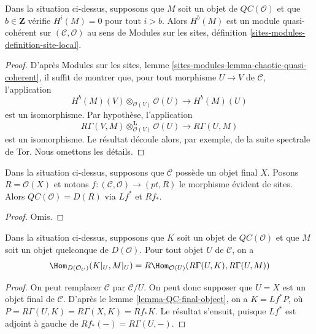 \begin{lemma}
\label{lemma-QC-bounded-above}
Dans la situation ci-dessus, supposons que $M$ soit un objet de
$\mathit{QC}(\mathcal{O})$ et que $b \in \mathbf{Z}$ vérifie $H^i(M) = 0$ pour
tout $i > b$. Alors $H^b(M)$ est un module quasi-cohérent sur
$(\mathcal{C}, \mathcal{O})$ au sens de Modules sur les sites, définition
\ref{sites-modules-definition-site-local}.
\end{lemma}

\begin{proof}
D'après Modules sur les sites, lemme
\ref{sites-modules-lemma-chaotic-quasi-coherent}, il suffit de montrer que,
pour tout morphisme $U \to V$ de $\mathcal{C}$, l'application
$$
H^b(M)(V) \otimes_{\mathcal{O}(V)} \mathcal{O}(U) \to H^b(M)(U)
$$
est un isomorphisme. Par hypothèse, l'application
$$
R\Gamma(V, M) \otimes_{\mathcal{O}(V)}^\mathbf{L} \mathcal{O}(U)
\to R\Gamma(U, M)
$$
est un isomorphisme. Le résultat découle alors, par exemple, de la suite
spectrale de Tor. Nous omettons les détails.
\end{proof}

\begin{lemma}
\label{lemma-QC-final-object}
Dans la situation ci-dessus, supposons que $\mathcal{C}$ possède un objet
final $X$. Posons $R = \mathcal{O}(X)$ et notons
$f : (\mathcal{C}, \mathcal{O}) \to (pt, R)$ le morphisme évident de sites.
Alors $\mathit{QC}(\mathcal{O}) = D(R)$ via $Lf^*$ et $Rf_*$.
\end{lemma}

\begin{proof}
Omis.
\end{proof}

\begin{lemma}
\label{lemma-QC-hom-out-of}
Dans la situation ci-dessus, supposons que $K$ soit un objet de
$\mathit{QC}(\mathcal{O})$ et que $M$ soit un objet quelconque de
$D(\mathcal{O})$. Pour tout objet $U$ de $\mathcal{C}$, on a
$$
\Hom_{D(\mathcal{O}_U)}(K|_U, M|_U) =
R\Hom_{\mathcal{O}(U)}(R\Gamma(U, K), R\Gamma(U, M))
$$
\end{lemma}

\begin{proof}
On peut remplacer $\mathcal{C}$ par $\mathcal{C}/U$. On peut donc supposer
que $U = X$ est un objet final de $\mathcal{C}$. D'après le lemme
\ref{lemma-QC-final-object}, on a $K = Lf^*P$, où
$P = R\Gamma(U, K) = R\Gamma(X, K) = Rf_*K$. Le résultat s'ensuit, puisque
$Lf^*$ est adjoint à gauche de $Rf_*(-) = R\Gamma(U, -)$.
\end{proof}

